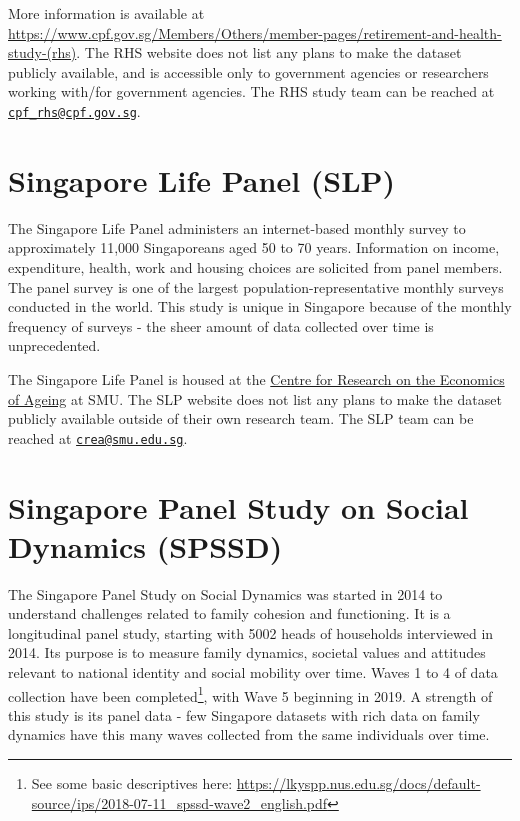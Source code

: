 \documentclass[openany]{book}
\let\rmarkdownfootnote\footnote%
\def\footnote{\protect\rmarkdownfootnote}
\begin{document}
More information is available at
\url{https://www.cpf.gov.sg/Members/Others/member-pages/retirement-and-health-study-(rhs)}.
The RHS website does not list any plans to make the dataset publicly
available, and is accessible only to government agencies or researchers
working with/for government agencies. The RHS study team can be reached
at \href{mailto:cpf_rhs@cpf.gov.sg}{\nolinkurl{cpf\_rhs@cpf.gov.sg}}.

\section{Singapore Life Panel (SLP)}\label{slp}

The Singapore Life Panel administers an internet-based monthly survey to
approximately 11,000 Singaporeans aged 50 to 70 years. Information on
income, expenditure, health, work and housing choices are solicited from
panel members. The panel survey is one of the largest
population-representative monthly surveys conducted in the world. This
study is unique in Singapore because of the monthly frequency of surveys
- the sheer amount of data collected over time is unprecedented.

The Singapore Life Panel is housed at the
\href{https://crea.smu.edu.sg/singapore-monthly-panel}{Centre for
Research on the Economics of Ageing} at SMU. The SLP website does not
list any plans to make the dataset publicly available outside of their
own research team. The SLP team can be reached at
\href{mailto:crea@smu.edu.sg}{\nolinkurl{crea@smu.edu.sg}}.

\section{Singapore Panel Study on Social Dynamics (SPSSD)}\label{spssd}

The Singapore Panel Study on Social Dynamics was started in 2014 to
understand challenges related to family cohesion and functioning. It is
a longitudinal panel study, starting with 5002 heads of households
interviewed in 2014. Its purpose is to measure family dynamics, societal
values and attitudes relevant to national identity and social mobility
over time. Waves 1 to 4 of data collection have been completed\footnote{See
  some basic descriptives here:
  \url{https://lkyspp.nus.edu.sg/docs/default-source/ips/2018-07-11_spssd-wave2_english.pdf}},
with Wave 5 beginning in 2019. A strength of this study is its panel
data - few Singapore datasets with rich data on family dynamics have
this many waves collected from the same individuals over time.
\end{document}
